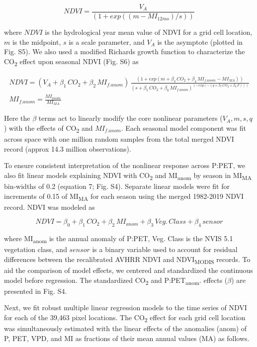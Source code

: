 \documentclass[gc, manuscript]{copernicus}
\begin{document}
\begin{equation}
NDVI = \frac{V_A}{(1+exp((m-MI_{12mo})/s))}
\end{equation}

where \(NDVI\) is the hydrological year mean value of NDVI for a grid
cell location, \(m\) is the midpoint, \(s\) is a scale parameter, and
\(V_A\) is the asymptote (plotted in Fig. S5). We also used a modified
Richards growth function to characterize the CO\textsubscript{2} effect
upon seasonal NDVI (Fig. S6) as

\begin{align}
NDVI=(V_A+\beta_1\,CO_2+\beta_2\,MI_{f.anom})\,\frac{(1+exp(m+\beta_3\,CO_2+\beta_4\,MI_{f.anom} - MI_{MA}))}{(s+\beta_5\,CO_2+\beta_6\,MI_{f.anom})^{(-exp(-(q+\beta_7\,CO_2+\beta_8\,F)))}}\\
MI_{f.anom} = \frac{MI_{anom}}{MI_{MA}}\nonumber
\end{align}

Here the \(\beta\) terms act to linearly modify the core nonlinear
parameters (\(V_A, m, s, q\)) with the effects of CO\textsubscript{2}
and \(MI_{f.anom}\). Each seasonal model component was fit across space
with one million random samples from the total merged NDVI record
(approx 14.3 million observations).

To ensure consistent interpretation of the nonlinear response across
P:PET, we also fit linear models explaining NDVI with
CO\textsubscript{2} and MI\textsubscript{anom} by season in
MI\textsubscript{MA} bin-widths of 0.2 (equation 7; Fig. S4). Separate
linear models were fit for increments of 0.15 of MI\textsubscript{MA}
for each season using the merged 1982-2019 NDVI record. NDVI was modeled
as

\begin{equation}
NDVI = \beta_0+\beta_1\,CO_2 + \beta_2\,MI_{anom}+\beta_3\,Veg.\,Class+\beta_4\,sensor
\end{equation}

where MI\textsubscript{anom} is the annual anomaly of P:PET, Veg. Class
is the NVIS 5.1 vegetation class, and \(sensor\) is a binary variable
used to account for residual differences between the recalibrated AVHRR
NDVI and NDVI\textsubscript{MODIS} records. To aid the comparison of
model effects, we centered and standardized the continuous model before
regression. The standardized CO\textsubscript{2} and
P:PET\textsubscript{anom}. effects (\(\beta\)) are presented in Fig. S4.

Next, we fit robust multiple linear regression models to the time series
of NDVI for each of the 39,463 pixel locations. The CO\textsubscript{2}
effect for each grid cell location was simultaneously estimated with the
linear effects of the anomalies (anom) of P, PET, VPD, and MI as
fractions of their mean annual values (MA) as follows.
\end{document}
